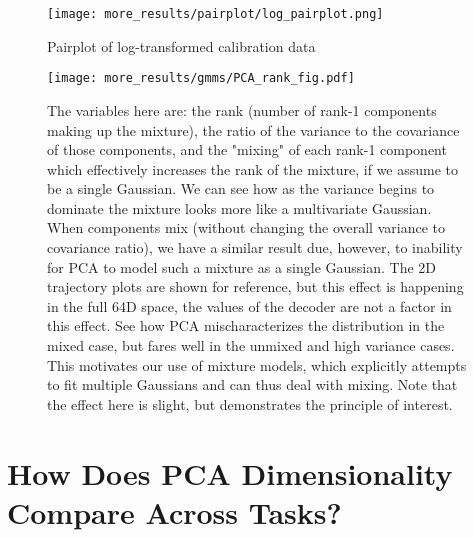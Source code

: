 \documentclass[../main.tex]{subfiles}
\begin{document}
\begin{figure}[tph]
  \centering
  \texttt{[image: more\_results/pairplot/log\_pairplot.png]}
  \caption[Pairplot of log-transformed calibration data]{Pairplot of log-transformed calibration data}\label{fig:log_pairplot}
\end{figure}

\begin{figure}[tph]
  \centering
    \texttt{[image: more\_results/gmms/PCA\_rank\_fig.pdf]}
    \caption[Explanatory Mixture Model]{The variables here are: the rank (number of rank-1 components making up the mixture), the ratio of the variance to the covariance of those components, and the "mixing" of each rank-1 component which effectively increases the rank of the mixture, if we assume to be a single Gaussian. We can see how as the variance begins to dominate the mixture looks more like a multivariate Gaussian. When components mix (without changing the overall variance to covariance ratio), we have a similar result due, however, to inability for PCA to model such a mixture as a single Gaussian. The 2D trajectory plots are shown for reference, but this effect is happening in the full 64D space, the values of the decoder are not a factor in this effect. See how PCA mischaracterizes the distribution in the mixed case, but fares well in the unmixed and high variance cases. This motivates our use of mixture models, which explicitly attempts to fit multiple Gaussians and can thus deal with mixing. Note that the effect here is slight, but demonstrates the principle of interest.}\label{fig:toy_model}
\end{figure}










\section{How Does PCA Dimensionality Compare Across Tasks?}
\end{document}
